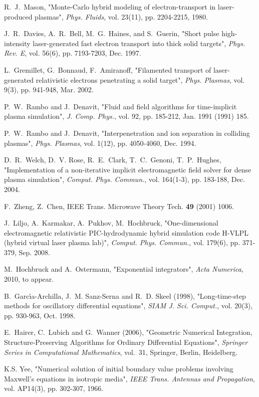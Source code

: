 \documentclass[conference]{IEEEtran}
\renewcommand{\~}{\widetilde }
\begin{document}
\begin{thebibliography}{}
 R.~J.~Mason, "Monte-Carlo hybrid modeling of electron-transport in laser-produced plasmas", {\em Phys. Fluids}, vol. 23(11), pp. 2204-2215, 1980.

 J.~R.~Davies, A.~R.~Bell, M.~G.~Haines, and S.~Guerin, 
"Short pulse high-intensity laser-generated fast electron transport into thick solid targets",
{\em Phys. Rev. E}, vol. 56(6), pp. 7193-7203, Dec. 1997.

 L.~Gremillet, G.~Bonnaud, F.~Amiranoff, "Filamented transport of laser-generated relativistic electrons penetrating a solid target",
{\em Phys. Plasmas}, vol. 9(3), pp. 941-948,  Mar. 2002.

 P.~W.~Rambo and J.~Denavit, "Fluid and field algorithms for time-implicit plasma simulation",
{\em J. Comp. Phys.}, vol. 92, pp. 185-212, Jan. 1991
(1991) 185.

 P.~W.~Rambo and J.~Denavit, "Interpenetration and ion separation in colliding plasmas", {\em Phys. Plasmas}, vol. 1(12), pp. 4050-4060,
Dec. 1994.

 D.~R.~Welch, D.~V. Rose, R.~E.~Clark, T.~C.~Genoni, T.~P.~Hughes, 
"Implementation of a non-iterative implicit electromagnetic field solver for dense plasma simulation", 
{\em Comput. Phys. Commun.}, vol. 164(1-3), pp. 183-188, Dec. 2004.

 F.~Zheng, Z.~Chen, IEEE Trans. Microwave Theory
Tech. {\bf 49} (2001) 1006.

 J.~Liljo, A.~Karmakar, A.~Pukhov, M.~Hochbruck, 
"One-dimensional electromagnetic relativistic PIC-hydrodynamic hybrid simulation code H-VLPL (hybrid virtual laser plasma lab)",
{\em Comput. Phys. Commun.}, vol. 179(6), pp. 371-379, Sep. 2008.

 M.~Hochbruck and A.~Ostermann, "Exponential integrators", {\em Acta Numerica}, 2010, to appear.

B.~Garc\'{\i}a-Archilla, J.~M. Sanz-Serna and R.~D. Skeel  (1998),
"Long-time-step methods for oscillatory differential equations",
{\em SIAM J. Sci. Comput.}, vol. 20(3), pp. 930-963, Oct. 1998.

E.~Hairer, C.~Lubich and G.~Wanner  (2006), "Geometric Numerical
  Integration, Structure-Preserving Algorithms for Ordinary Differential
  Equations", {\em Springer Series in Computational Mathematics}, vol.~31, 
  Springer, Berlin, Heidelberg.

 K.S. Yee, 
"Numerical solution of initial boundary value problems involving
Maxwell's equations in isotropic media", 
{\em IEEE Trans. Antennas and Propagation}, vol. AP14(3), pp. 302-307, 1966.


\end{thebibliography}
\end{document}
